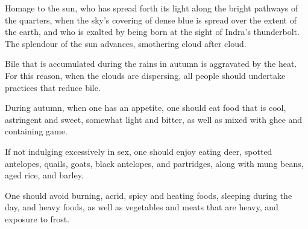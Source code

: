 \begin{translation}
\item[15cd--17ab] %
Homage to the sun, who has spread forth its light along the bright pathways of the quarters, when the sky's covering of dense blue is spread over the extent of the earth, and who is exalted by being born at the sight of Indra’s thunderbolt. The splendour of the sun advances, smothering cloud after cloud.

\item[17cd--18ab] %
 Bile that is accumulated during the rains in autumn is aggravated by the heat. For this reason, when the clouds are dispersing, all people should undertake practices that reduce bile. 

\item[18cd--19ab] %
During autumn, when one has an appetite, one should eat food that is cool, astringent and sweet, somewhat light and  bitter, as well as mixed with ghee and containing game.

\item[19cd--20ab] %
If not indulging excessively in sex, one should enjoy eating deer, spotted antelopes, quails, goats, black antelopes, and  partridges, along with mung beans, aged rice, and barley.

\item[20cd--21ab] %
One should avoid burning, acrid, spicy and heating foods, sleeping during the day, and heavy foods, as well as vegetables and meats that are heavy, and exposure to frost.



\end{translation}
